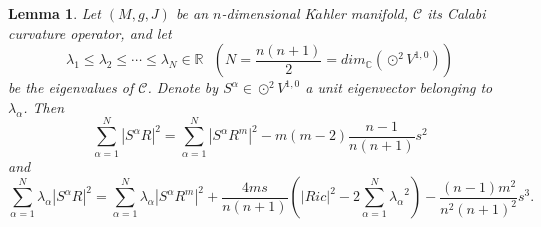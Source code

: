 \documentclass{amsart}
\newtheorem{lemma}[theorem]{Lemma}
\theoremstyle{definition}
\theoremstyle{remark}
\numberwithin{equation}{section}
\begin{document}
\begin{lemma}
\label{lemma4.5}
Let $\left(M,g,J\right)$ be an $n$-dimensional K$\ddot a$hler manifold, $\mathcal{C}$ its  Calabi curvature operator, and let
$${\lambda _1}\le{\lambda _2}\le \cdots \le {\lambda _N} \in \mathbb{R}\ \ \ (N = \frac{{n(n + 1)}}{2} = dim_{\mathbb{C}}\left( { \odot ^2}{V^{1,0}} \right))$$ be the eigenvalues of $\mathcal{C}$. Denote by ${{S^\alpha }} \in {{ \odot ^2}{V^{1,0}}}$ a unit eigenvector belonging to ${\lambda _\alpha}$. Then
$$\sum\limits_{\alpha  = 1}^N {{{\left| {{S^\alpha }R} \right|}^2}}  = \sum\limits_{\alpha  = 1}^N {{{\left| {{S^\alpha }{R^m}} \right|}^2}}  - m\left( {m - 2} \right)\frac{{n - 1}}{{n\left( {n + 1} \right)}}{s^2}$$
and
$$\sum\limits_{\alpha  = 1}^N {{\lambda _\alpha }{{\left| {{S^\alpha }R} \right|}^2}}  = \sum\limits_{\alpha  = 1}^N {{\lambda _\alpha }{{\left| {{S^\alpha }{R^m}} \right|}^2}}  + \frac{{4ms}}{{n\left( {n + 1} \right)}}\left( {{{\left| {Ric} \right|}^2} - 2\sum\limits_{\alpha  = 1}^N {{\lambda _\alpha }^2} } \right) - \frac{(n - 1){m^2}}{{{n^2}{{\left( {n + 1} \right)}^2}}}{s^3}.$$
\end{lemma}
\end{document}
